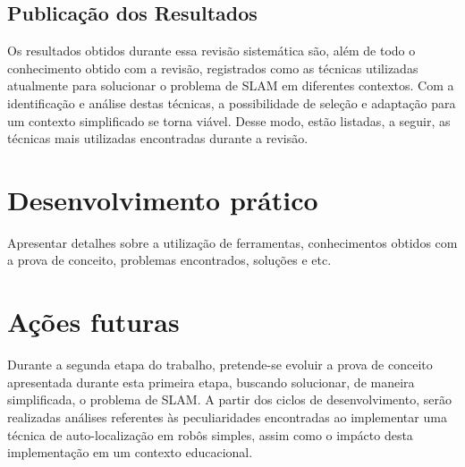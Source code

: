 	\subsection{Publicação dos Resultados} %
	\label{sub:publicacaoRevisao}
		
		Os resultados obtidos durante essa revisão sistemática são, além de todo o conhecimento obtido com a revisão, registrados como as técnicas utilizadas atualmente para solucionar o problema de SLAM em diferentes contextos. Com a identificação e análise destas técnicas, a possibilidade de seleção e adaptação para um contexto simplificado se torna viável. Desse modo, estão listadas, a seguir, as técnicas mais utilizadas encontradas durante a revisão.




\section{Desenvolvimento prático} %
\label{sec:desenvolvimento_prático}

	Apresentar detalhes sobre a utilização de ferramentas, conhecimentos obtidos com a prova de conceito, problemas encontrados, soluções e etc.

\section{Ações futuras} %
\label{sec:acoes_futuras}

	Durante a segunda etapa do trabalho, pretende-se evoluir a prova de conceito apresentada durante esta primeira etapa, buscando solucionar, de maneira simplificada, o problema de SLAM. A partir dos ciclos de desenvolvimento, serão realizadas análises referentes às peculiaridades encontradas ao implementar uma técnica de auto-localização em robôs simples, assim como o impácto desta implementação em um contexto educacional.

